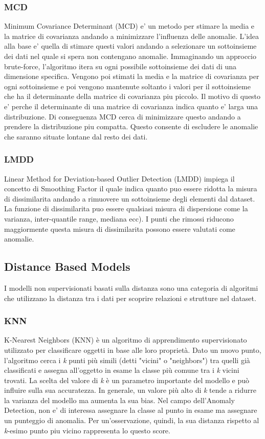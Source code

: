 \subsubsection{MCD}
Minimum Covariance Determinant (MCD) e' un metodo per stimare la media e la matrice di covarianza andando a minimizzare l'influenza delle anomalie. L'idea alla base e' quella di stimare questi valori andando a selezionare un sottoinsieme dei dati nel quale si spera non contengano anomalie.
Immaginando un approccio brute-force, l'algoritmo itera su ogni possibile sottoinsieme dei dati di una dimensione specifica. Vengono poi stimati la media e la matrice di covarianza per ogni sottoinsieme e poi vengono mantenute soltanto i valori per il sottoinsieme che ha il determinante della matrice di covarianza piu piccolo. Il motivo di questo e' perche il determinante di una matrice di covarianza indica quanto e' larga una distribuzione. Di conseguenza MCD cerca di minimizzare questo andando a prendere la distribuzione piu compatta. Questo consente di escludere le anomalie che saranno situate lontane dal resto dei dati.

\subsubsection{LMDD}
Linear Method for Deviation-based Outlier Detection (LMDD) impiega il concetto di Smoothing Factor il quale indica quanto puo essere ridotta la misura di dissimilarita andando a rimuovere un sottoinsieme degli elementi dal dataset. La funzione di dissimilarita puo essere qualsiasi misura di dispersione come la varianza, inter-quantile range, mediana ecc).
I punti che rimossi riducono maggiormente questa misura di dissimilarita possono essere valutati come anomalie.

\subsection{Distance Based Models}
I modelli non supervisionati basati sulla distanza sono una categoria di algoritmi che utilizzano la distanza tra i dati per scoprire relazioni e strutture nel dataset.

\subsubsection{KNN}
K-Nearest Neighbors (KNN) è un algoritmo di apprendimento supervisionato utilizzato per classificare oggetti in base alle loro proprietà. Dato un nuovo punto, l'algoritmo cerca i \textit{k} punti più simili (detti "vicini" o "neighbors") tra quelli già classificati e assegna all'oggetto in esame la classe più comune tra i \textit{k} vicini trovati. La scelta del valore di \textit{k} è un parametro importante del modello e può influire sulla sua accuratezza. In generale, un valore più alto di \textit{k} tende a ridurre la varianza del modello ma aumenta la sua bias.
Nel campo dell'Anomaly Detection, non e' di interessa assegnare la classe al punto in esame ma assegnare un punteggio di anomalia. Per un'osservazione, quindi, la sua distanza rispetto al \textit{k}-esimo punto piu vicino rappresenta lo questo score.

